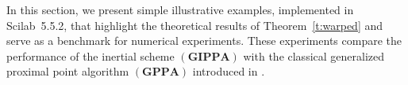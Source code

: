 \documentclass[11pt]{article}
\theoremstyle{definition}
\theoremstyle{definition}
\newtheorem{example}[theorem]{Example}
\theoremstyle{definition}
\newcommand{\Id}{\ensuremath{\operatorname{Id}}}
\begin{document}
In this section, we present simple illustrative examples, implemented in Scilab~5.5.2, that highlight the theoretical results of Theorem~\ref{t:warped} and serve as a benchmark for numerical experiments. These experiments compare the performance of the inertial scheme $(\mathbf{GIPPA})$ with the classical generalized proximal point algorithm $(\mathbf{GPPA})$ introduced in \cite{Arag,LDT}.

%
%
%
%
%	
%	
\end{document}
